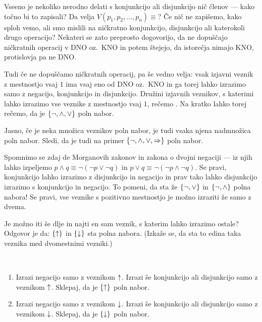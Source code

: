                 Vseeno je nekoliko nerodno delati s konjunkcijo ali disjunkcijo nič členov --- kako točno bi to zapisali? Da velja $V(p_1, p_2, \ldots, p_n) \equiv $? Če nič ne zapišemo, kako sploh vemo, ali smo mislili na ničkratno konjunkcijo, disjunkcijo ali katerokoli drugo operacijo? Nekateri se zato preprosto dogovorijo, da ne dopuščajo ničkratnih operacij v DNO oz.~KNO in potem štejejo, da istorečja nimajo KNO, protislovja pa ne DNO.

                Tudi če ne dopuščamo ničkratnih operacij, pa še vedno velja: vsak izjavni veznik z mestnostjo vsaj $1$ ima vsaj eno od DNO oz.~KNO in ga torej lahko izrazimo samo z negacijo, konjunkcijo in disjunkcijo. Družini izjavnih veznikov, s katerimi lahko izrazimo vse veznike z mestnostjo vsaj $1$, rečemo . Na kratko lahko torej rečemo, da je $\set{\lnot, \land, \lor}$ poln nabor.

                Jasno, če je neka množica veznikov poln nabor, je tudi vsaka njena nadmnožica poln nabor. Sledi, da je tudi na primer $\set{\lnot, \land, \lor, \impl}$ poln nabor.

                Spomnimo se zdaj de Morganovih zakonov in zakona o dvojni negaciji --- iz njih lahko izpeljemo $p \land q \equiv \lnot(\lnot{p} \lor \lnot{q})$ in $p \lor q \equiv \lnot(\lnot{p} \land \lnot{q})$. Se pravi, konjunkcijo lahko izrazimo z disjunkcijo in negacijo in prav tako lahko disjunkcijo izrazimo s konjunkcijo in negacijo. To pomeni, da sta že $\set{\lnot, \lor}$ in $\set{\lnot, \land}$ polna nabora! Se pravi, vse veznike s pozitivno mestnostjo je možno izraziti že samo z dvema.

                Je možno iti še dlje in najti en sam veznik, s katerim lahko izrazimo ostale? Odgovor je da: $\set{\shf}$ in $\set{\luk}$ sta polna nabora. (Izkaže se, da sta to edina taka veznika med dvomestnimi vezniki.)

                \begin{vaja}\label{vaja:polni-nabori-z-enim-veznikom}
                        \
                        \begin{enumerate}
                                \item
                                        Izrazi negacijo samo z veznikom $\mathbin{\uparrow}$. Izrazi še konjunkcijo ali disjunkcijo samo z veznikom $\mathbin{\uparrow}$. Sklepaj, da je $\set{\shf}$ poln nabor.
                                \item
                                        Izrazi negacijo samo z veznikom $\mathbin{\downarrow}$. Izrazi še konjunkcijo ali disjunkcijo samo z veznikom $\mathbin{\downarrow}$. Sklepaj, da je $\set{\luk}$ poln nabor.
                        \end{enumerate}
                \end{vaja}

